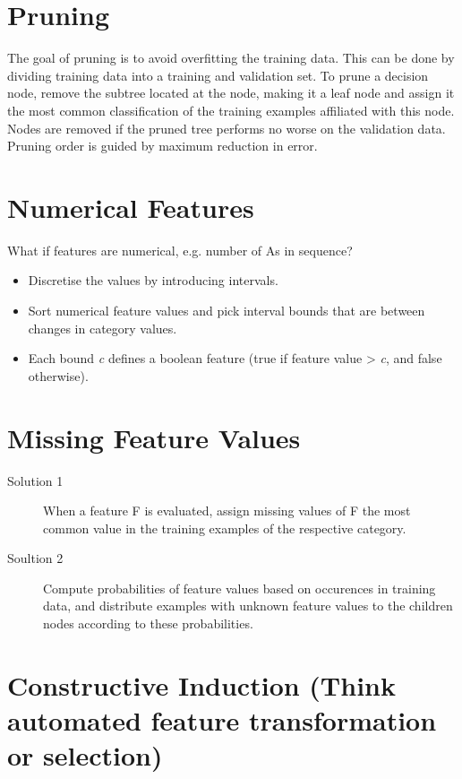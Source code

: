 \documentclass[11pt]{article}
\begin{document}
\section{Pruning}
\label{sec:org4389326}
The goal of pruning is to avoid overfitting the training data.
This can be done by dividing training data into a training and validation set.
To prune a decision node, remove the subtree located at the node, making it a leaf node and assign it the most common classification of the training examples affiliated with this node.
Nodes are removed if the pruned tree performs no worse on the validation data.
Pruning order is guided by maximum reduction in error.

\section{Numerical Features}
\label{sec:orgce7354a}
What if features are numerical, e.g. number of As in sequence?
\begin{itemize}
\item Discretise the values by introducing intervals.
\item Sort numerical feature values and pick interval bounds that are between changes in category values.
\item Each bound \emph{c} defines a boolean feature (true if feature value > \emph{c}, and false otherwise).
\end{itemize}

\section{Missing Feature Values}
\label{sec:org5b4c19b}
\begin{description}
\item[{Solution 1}] When a feature F is evaluated, assign missing values of F the most common value in the training examples of the respective category.
\item[{Soultion 2}] Compute probabilities of feature values based on occurences in training data, and distribute examples with unknown feature values to the children nodes according to these probabilities.
\end{description}

\section{Constructive Induction (Think automated feature transformation or selection)}
\label{sec:org0a672bc}
\end{document}
